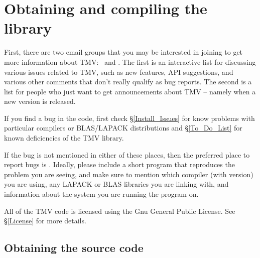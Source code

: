 
\section{Obtaining and compiling the library}
\label{Install}

First, there are two email groups that you may be interested in joining to get more 
information about TMV:
\mygrouptt\ and \mygroupann.
The first is an interactive list for discussing various issues related to TMV, such as 
new features, API suggestions, and various other comments that don't really qualify
as bug reports.  The second is a list for people who just want to get announcements 
about TMV -- namely when a new version is released.

If you find a bug in the code, first check \S\ref{Install_Issues} for know problems with 
particular compilers or BLAS/LAPACK distributions and \S\ref{To_Do_List} for known
deficiencies of the TMV library.

If the bug is not mentioned in either of these places, then the preferred place to report 
bugs is \myissues.  Ideally, please include a short program that reproduces the problem
you are seeing, and make sure to mention which compiler (with version) you are using,
any LAPACK or BLAS libraries you are linking with, and information about the system 
you are running the program on. 

All of the TMV code is licensed using the Gnu General Public License.  See 
\S\ref{License} for more details.

\subsection{Obtaining the source code}
\label{Install_Obtain}


